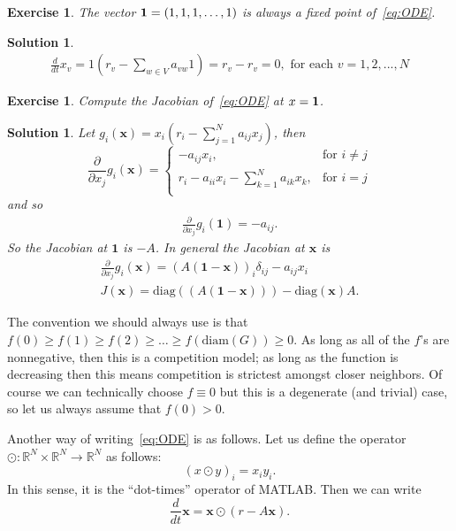 \documentclass{article}
\newcommand{\R}{\mathbb{R}}
\newtheorem{exercise}[thm]{Exercise}
\newtheorem{soln}[thm]{Solution}
\newcommand{\1}{\mathbf{1}}
\newcommand{\0}{\mathbf{0}}
\newcommand{\x}{{\mathbf {{x}}}}
\newcommand{\diam}{\mathrm{diam}}
\newcommand{\diag}{\mathrm{diag}}
\begin{document}
\begin{exercise}
  The vector ${\bf 1} = (1,1,1,\dots,1)$ is always a fixed point of~\eqref{eq:ODE}.
\end{exercise}
\begin{soln}
\begin{eqnarray*}
	\frac{d}{dt}x_v = 1(r_v - \sum_{w\in V} a_{vw} 1) = r_v - r_v = 0, \mbox{ for each } v=1,2,...,N
\end{eqnarray*}
\end{soln}


\begin{exercise}\label{ex:Jacobian}
  Compute the Jacobian of~\eqref{eq:ODE} at $x={\bf 1}$.
\end{exercise}
\begin{soln}
Let $g_i(\x) = x_i (r_i - \sum_{j=1}^N a_{ij} x_j)$, then 
$$
\frac{\partial}{\partial x_j} g_i(\x) = 
\begin{cases}
-a_{ij} x_i,	&	\mbox{for } i \neq j \\
r_i - a_{ii} x_i - \sum_{k = 1}^N a_{ik} x_k,	&	\mbox{for } i = j  \\
\end{cases}
$$
and so
\begin{align*}
\frac{\partial}{\partial x_j} g_i(\1) = -a_{ij}.
\end{align*}
So the Jacobian at $\1$ is $-A$.
In general the Jacobian at $\x$ is 
\begin{align*}
\frac{\partial}{\partial x_j} g_i(\x) = (A(\1 - \x))_i \delta_{ij} - a_{ij} x_i \\
J(\x) = \diag((A(\1 - \x))) - \diag(\x) A.
\end{align*}

\end{soln}



The convention we should always use is that $f(0)\ge f(1)\ge f(2) \ge\dots\ge f(\diam(G)) \ge 0$.  As long as all of the $f$'s are nonnegative, then this is a competition model; as long as the function is decreasing then this means competition is strictest amongst closer neighbors.  Of course we can technically choose $f\equiv 0$ but this is a degenerate (and trivial) case, so let us always assume that $f(0)>0$.

Another way of writing~\eqref{eq:ODE} is as follows.  Let us define the operator $\odot\colon\R^N\times \R^N\to\R^N$ as follows:
\begin{equation*}
  (x\odot y)_i = x_iy_i.
\end{equation*}
In this sense, it is the ``dot-times'' operator of MATLAB.  Then we can write
\begin{equation*}
  \frac{d}{dt} \x = \x \odot (r-A \x).
\end{equation*}
\end{document}
